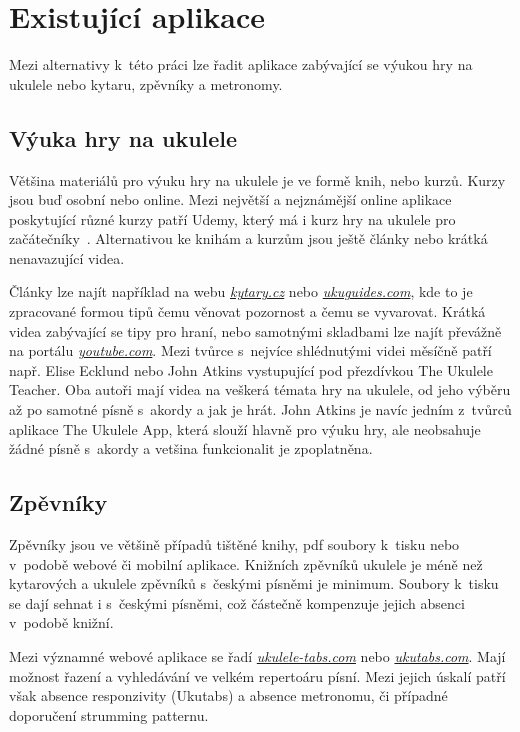 \section{Existující aplikace}
\label{sc:existing_apps}
Mezi alternativy k~této práci lze řadit aplikace zabývající se výukou hry na ukulele nebo kytaru, zpěvníky a metronomy.

\subsection{Výuka hry na ukulele}
\label{ss:existing_teaching_apps}
Většina materiálů pro výuku hry na ukulele je ve formě knih, nebo kurzů.
Kurzy jsou buď osobní nebo online. Mezi největší a nejznámější online aplikace poskytující různé kurzy patří Udemy, který má i kurz hry na ukulele pro začátečníky~\cite{puchmayr_complete}. Alternativou ke knihám a kurzům jsou ještě články nebo krátká nenavazující videa.

Články lze najít například na webu \href{www.kytary.cz}{\emph{kytary.cz}} nebo \href{www.ukuguides.com}{\emph{ukuguides.com}}, kde to je zpracované formou tipů čemu věnovat pozornost a čemu se vyvarovat. Krátká videa zabývající se tipy pro hraní, nebo samotnými skladbami lze najít převážně na portálu \href{www.youtube.com}{\emph{youtube.com}}. Mezi tvůrce s~nejvíce shlédnutými videi měsíčně patří např. Elise Ecklund nebo John Atkins vystupující pod přezdívkou The Ukulele Teacher. Oba autoři mají videa na veškerá témata hry na ukulele, od jeho výběru až po samotné písně s~akordy a jak je hrát. John Atkins je navíc jedním z~tvůrců aplikace The Ukulele App, která slouží hlavně pro výuku hry, ale neobsahuje žádné písně s~akordy a vetšina funkcionalit je zpoplatněna.

\subsection{Zpěvníky}
\label{ss:songbooks}
Zpěvníky jsou ve většině případů tištěné knihy, pdf soubory k~tisku nebo v~podobě webové či mobilní aplikace. Knižních zpěvníků ukulele je méně než kytarových a ukulele zpěvníků s~českými písněmi je minimum. Soubory k~tisku se dají sehnat i s~českými písněmi, což částečně kompenzuje jejich absenci v~podobě knižní.

Mezi významné webové aplikace se řadí \href{www.ukulele-tabs.com}{\emph{ukulele-tabs.com}} nebo \href{www.ukutabs.com}{\emph{ukutabs.com}}. Mají možnost řazení a vyhledávání ve velkém repertoáru písní. Mezi jejich úskalí patří však absence responzivity (Ukutabs) a absence metronomu, či případné doporučení strumming patternu.

